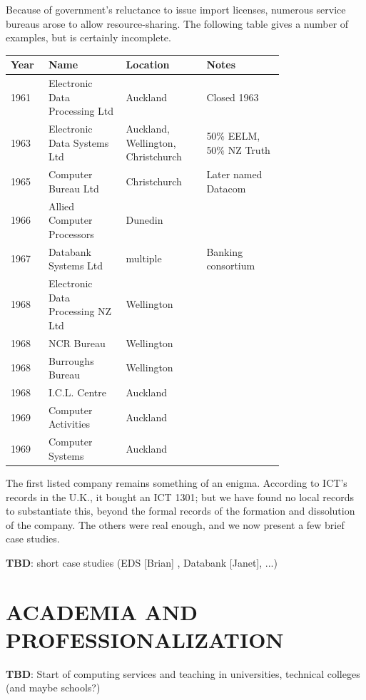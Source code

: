 \documentclass{IEEEcsmag}
\begin{document}
Because of government's reluctance to issue import licenses, numerous service bureaus arose to allow resource-sharing. The following table gives a number of examples, but is certainly incomplete.

\begin{center}
\begin{tabular}{ |p{0.07\linewidth}|p{0.23\linewidth}|p{0.23\linewidth}|p{0.23\linewidth}<{\raggedright}| } 
 \hline
 Year & Name & Location & Notes\\ 
\hline
1961 & Electronic Data Processing Ltd & Auckland & Closed 1963\\\hline
1963 & Electronic Data Systems Ltd & Auckland, Wellington, Christchurch & 50\% EELM, 50\% NZ Truth\\\hline 
1965 & Computer Bureau Ltd & Christchurch & Later named Datacom\\\hline
1966 & Allied Computer Processors & Dunedin & \\\hline
1967 & Databank Systems Ltd & multiple & Banking consortium\\\hline
1968 & Electronic Data Processing NZ Ltd& Wellington&\\\hline
1968 & NCR Bureau & Wellington &\\\hline
1968 & Burroughs Bureau & Wellington &\\\hline
1968 & I.C.L. Centre& Auckland&\\\hline
1969 & Computer Activities& Auckland&\\\hline
1969 & Computer Systems& Auckland&\\
 \hline
\end{tabular}
\end{center}

The first listed company remains something of an enigma. According to ICT's records in the U.K., it bought an ICT 1301; but we have found no local records to substantiate this, beyond the formal records of the formation and dissolution of the company. The others were real enough, and we now present a few brief case studies.

{\bf TBD}: short case studies (EDS [Brian] , Databank [Janet], ...)

\vspace*{-8pt}
\section{ACADEMIA AND PROFESSIONALIZATION}

{\bf TBD}: Start of computing services and teaching in universities, technical colleges (and maybe schools?)
\end{document}
